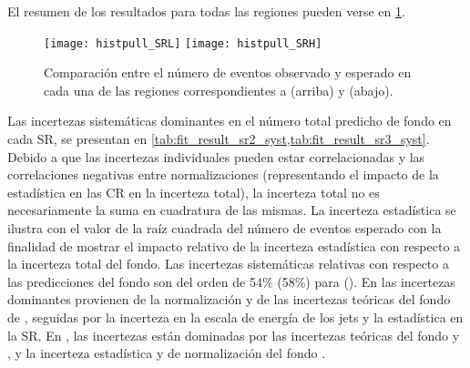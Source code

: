 El resumen de los resultados para todas las regiones pueden verse en
\cref{fig:fit_region_composition}.


\begin{figure}[!htbp]
  \centering

  \texttt{[image: histpull\_SRL]}
  \texttt{[image: histpull\_SRH]}

  \caption{Comparación entre el número de eventos observado y esperado en cada
    una de las regiones correspondientes a {\SRL} (arriba) y {\SRH} (abajo).}

  \label{fig:fit_region_composition}

\end{figure}


Las incertezas sistemáticas dominantes  en el número total predicho de fondo en cada SR,
se presentan en \cref{tab:fit_result_sr2_syst,tab:fit_result_sr3_syst}.
Debido a que las incertezas individuales pueden estar correlacionadas y las
correlaciones negativas entre normalizaciones (representando el impacto de la
estadística en las CR en la incerteza total), la incerteza total no es
necesariamente la suma en cuadratura de las mismas.
La incerteza estadística se ilustra con el valor de la raíz cuadrada del número de eventos esperado con
la finalidad de mostrar el impacto relativo de la incerteza estadística con respecto a la
incerteza total del fondo. Las incertezas sistemáticas relativas con respecto a
las predicciones del fondo son del orden de 54\% (58\%) para {\SRL}
(\SRH). En {\SRL} las incertezas dominantes provienen de la
normalización y de las incertezas teóricas del fondo de {\ttgam}, seguidas por la
incerteza en la escala de energía de los jets y la estadística en la SR. En
{\SRH}, las incertezas están dominadas por las incertezas teóricas del fondo
{\zgam} y {\gjet}, y la incerteza estadística y de normalización del fondo
{\wgam}.


